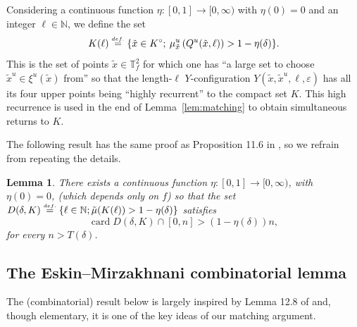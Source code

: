 \documentclass[a4paper,11pt,reqno]{amsart}
\newcommand{\N}{{\mathbb N}}
\newcommand{\TTf}{{\mathbb{T}_f^2}}
\newcommand{\eps}{\varepsilon}
\newcommand{\card}{\operatorname{card}}
\newcommand{\eqdef}{\stackrel{\scriptscriptstyle\textrm def.}{=}}
\newcommand{\tix}{\tilde{x}}
\newcommand{\tm}{\tilde{\mu}}
\newtheorem{lemma}[theorem]{Lemma}
\theoremstyle{definition}
\begin{document}
Considering a continuous function $\eta:[0,1]\to[0,\infty)$ with $\eta(0)=0$ and an integer $\ell\in\N$, we define the set 
\[
K(\ell)\eqdef\{\tix\in K^\circ;\:\mu^u_{\tix}\left(Q^u(\tix,\ell)\right)>1-\eta(\delta)\}.
\]
This is the set of points $\tix\in\TTf$ for which one has ``a large set to choose $\tix^u\in\xi^u(\tix)$ from'' so that the length-$\ell$ $Y$-configuration $Y(\tix,\tix^u,\ell,\eps)$ has all its four upper points being ``highly recurrent'' to the compact set $K$. This high recurrence is used in the end of Lemma~\ref{lem:matching} to obtain simultaneous returns to $K$. 

The following result has the same proof as Proposition 11.6 in \cite{ALOS}, so we refrain from repeating the details. 

\begin{lemma}
    \label{lem:claim64}
    There exists a continuous function $\eta:[0,1]\to[0,\infty)$, with $\eta(0)=0$, (which depends only on $f$) so that the set $D(\delta,K)\eqdef\{\ell\in\N;\tm(K(\ell))>1-\eta(\delta)\}$ satisfies 
    \[
    \card D(\delta,K)\cap [0,n]>(1-\eta(\delta))n,
    \]
    for every $n>T(\delta)$. 
\end{lemma}

\subsection{The Eskin--Mirzakhnani combinatorial lemma}

The (combinatorial) result below is largely inspired by Lemma 12.8 of \cite{EskinMirzakhani} and, though elementary, it is one of the key ideas of our matching argument. 
\end{document}
